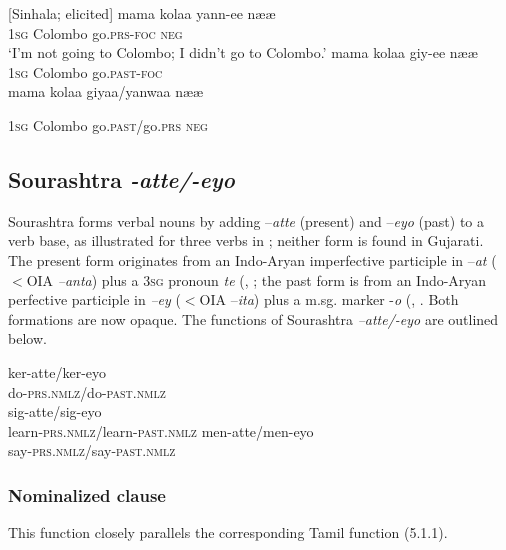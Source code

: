 \ea\label{smith:ex:28}
{}[Sinhala; elicited]
\ea
\gll mama kola{\umb}a yann-ee n{\ae}{\ae}\\
1\textsc{sg} Colombo go.\textsc{prs}-\textsc{foc} \textsc{neg}\\
`I'm not going to Colombo; I didn't go to Colombo.'
\ex
 mama kola{\umb}a giy-ee n{\ae}{\ae}\\
 1\textsc{sg} Colombo go.\textsc{past}-\textsc{foc}\\
\ex *mama kola{\umb}a giyaa/yan{\textschwa}waa n{\ae}{\ae}

 1\textsc{sg} Colombo go.\textsc{past}/go.\textsc{prs} \textsc{neg} \\
\z
\z

\subsection{Sourashtra \textit{{}-atte/-eyo} }

Sourashtra forms verbal nouns by adding --\textit{atte} (present) and --\textit{eyo} (past) to a verb base, as illustrated for three verbs in ; neither form is found in Gujarati. The present form originates from an Indo-Aryan imperfective participle in --\textit{at} ($<$OIA \textit{{}--anta}) plus a 3\textsc{sg} pronoun \textit{te }(\citet[272]{Masica1991}, \citet[93,100]{Cardona1965}; the past form is from an Indo-Aryan perfective participle in \textit{{}--ey} ($<$OIA --\textit{ita}) plus a m.sg. marker -\textit{o }(\citet[272]{Masica1991}, \citet[100-1]{Cardona1965}. Both formations are now opaque. The functions of Sourashtra\textit{ --atte/-eyo} are outlined below.

\ea\label{smith:ex:29}
\ea
\gll ker-atte/ker-eyo \\
do-\textsc{prs}.\textsc{nmlz}/do-\textsc{past}.\textsc{nmlz} \\
\ex sig-atte/sig-eyo \\
 learn-\textsc{prs}.\textsc{nmlz}/learn-\textsc{past}.\textsc{nmlz}
\ex men-atte/men-eyo\\
say-\textsc{prs}.\textsc{nmlz}/say-\textsc{past}.\textsc{nmlz}\\
\z
\z

\subsubsection{Nominalized clause}%

This function closely parallels the corresponding Tamil function (5.1.1).

